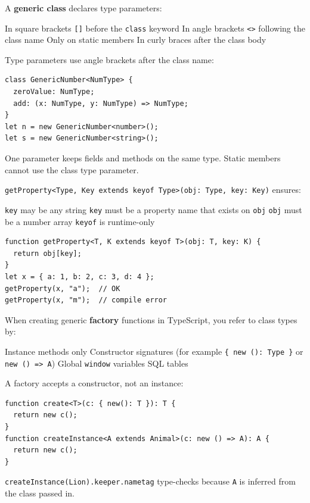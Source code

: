 \question[4]
A \textbf{generic class} declares type parameters:
\begin{choices}
  \choice In square brackets \texttt{[]} before the \texttt{class} keyword
  \CorrectChoice In angle brackets \texttt{<>} following the class name
  \choice Only on static members
  \choice In curly braces after the class body
\end{choices}
\begin{solution}
  Type parameters use angle brackets after the class name:
\begin{lstlisting}[style=ts]
class GenericNumber<NumType> {
  zeroValue: NumType;
  add: (x: NumType, y: NumType) => NumType;
}
let n = new GenericNumber<number>();
let s = new GenericNumber<string>();
\end{lstlisting}
  One parameter keeps fields and methods on the same type. Static members cannot use the class type parameter.
\end{solution}

\question[4]
\texttt{getProperty<Type, Key extends keyof Type>(obj: Type, key: Key)} ensures:
\begin{choices}
  \choice \texttt{key} may be any string
  \CorrectChoice \texttt{key} must be a property name that exists on \texttt{obj}
  \choice \texttt{obj} must be a number array
  \choice \texttt{keyof} is runtime-only
\end{choices}
\begin{solution}
\begin{lstlisting}[style=ts]
function getProperty<T, K extends keyof T>(obj: T, key: K) {
  return obj[key];
}
let x = { a: 1, b: 2, c: 3, d: 4 };
getProperty(x, "a");  // OK
getProperty(x, "m");  // compile error
\end{lstlisting}
\end{solution}

\question[4]
When creating generic \textbf{factory} functions in TypeScript, you refer to class types by:
\begin{choices}
  \choice Instance methods only
  \CorrectChoice Constructor signatures (for example \texttt{\{ new (): Type \}} or \texttt{new () => A})
  \choice Global \texttt{window} variables
  \choice SQL tables
\end{choices}
\begin{solution}
  A factory accepts a constructor, not an instance:
\begin{lstlisting}[style=ts]
function create<T>(c: { new(): T }): T {
  return new c();
}
function createInstance<A extends Animal>(c: new () => A): A {
  return new c();
}
\end{lstlisting}
  \lstinline[style=tsinline]{createInstance(Lion).keeper.nametag} type-checks because \lstinline[style=tsinline]{A} is inferred from the class passed in.
\end{solution}


